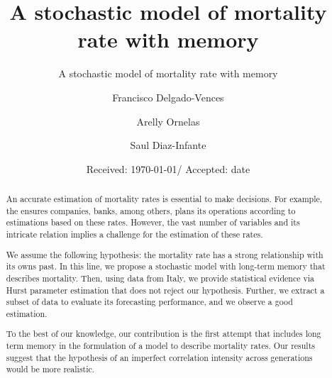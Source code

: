 \documentclass[smallextended]{svjour3}
\begin{document}
%
    \title{A stochastic model of mortality rate with memory}
    \subtitle{A stochastic model of mortality rate with memory}
    \author{Francisco Delgado-Vences 
        \and
        Arelly Ornelas
        \and
        Saul Diaz-Infante
    }
%
    \date{Received: \today / Accepted: date}
    \maketitle
%
    \begin{abstract}
            An accurate estimation of mortality rates is essential to make
        decisions. For example, the ensures companies, banks, 
        among others, plans its operations according to estimations  based 
        on  these rates. However, the vast number of variables and its 
        intricate relation implies a challenge for the estimation of these 
        rates.
    
            We assume the following hypothesis: the mortality rate has a strong
        relationship with its owns past. In this line, we propose a stochastic
        model with long-term memory that describes mortality. Then, using data 
        from Italy, we provide statistical evidence via Hurst parameter 
        estimation that does not reject our hypothesis. Further, we extract a 
        subset of data to evaluate its forecasting performance, and we observe 
        a good estimation.
    
            To the best of our knowledge, our contribution is the first attempt
        that includes long term memory in the formulation of a model to
        describe mortality rates. Our results suggest that the hypothesis of an
        imperfect correlation intensity across generations would be more 
        realistic.
    \end{abstract}
%
%
\end{document}

